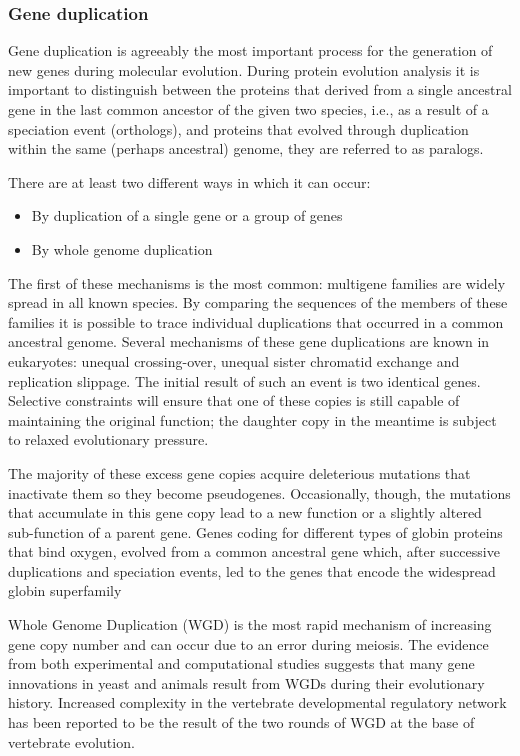 \documentclass[11pt, a4paper,oneside]{report}
\begin{document}
\subsubsection{Gene duplication}
Gene duplication is agreeably the most important process for the generation of new genes during molecular evolution. During protein evolution analysis it is important to distinguish between the proteins that derived from a single ancestral gene in the last common ancestor of the given two species, i.e., as a result of a speciation event (orthologs), and proteins that evolved through duplication within the same (perhaps ancestral) genome, they are referred to as paralogs\cite{Jensen2001}.

There are at least two different ways in which it can occur: 
\begin{itemize} 
\item By duplication of a single gene or a group of genes 
\item By whole genome duplication 
\end{itemize}

The first of these mechanisms is the most common: multigene families are widely spread in all known species. By comparing the sequences of the members of these families it is possible to trace individual duplications that occurred in a common ancestral genome. Several mechanisms of these gene duplications are known in eukaryotes: unequal crossing-over, unequal sister chromatid exchange and replication slippage. The initial result of such an event is two identical genes. Selective constraints will ensure that one of these copies is still capable of maintaining the original function; the daughter copy in the meantime is subject to relaxed evolutionary pressure.

The majority of these excess gene copies acquire deleterious mutations that inactivate them so they become pseudogenes\cite{Zhang2001}. Occasionally, though, the mutations that accumulate in this gene copy lead to a new function or a slightly altered sub-function of a parent gene.  Genes coding for different types of globin proteins that bind oxygen, evolved from a common ancestral gene which, after successive duplications and speciation events, led to the genes that encode the widespread globin superfamily\cite{Hardison1998}

Whole Genome Duplication (WGD) is the most rapid mechanism of increasing gene copy number and can occur due to an error during meiosis. The evidence from both experimental and computational studies suggests that many gene innovations in yeast and animals result from WGDs during their evolutionary history\cite{Dehal2005}. Increased complexity in the vertebrate developmental regulatory network has been reported to be the result of the two rounds of WGD at the base of vertebrate evolution\cite{Huminiecki2012}. 
\end{document}
